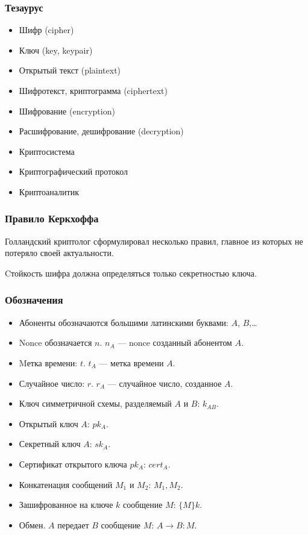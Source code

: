 \begin{frame}
    \frametitle{Тезаурус}

    \begin{itemize}
        \item Шифр (cipher)
        \item Ключ (key, keypair)
        \item Открытый текст (plaintext)
        \item Шифротекст, криптограмма (ciphertext)
        \item Шифрование (encryption)
        \item Расшифрование, дешифрование (decryption) 
        \item Криптосистема
        \item Криптографический протокол
        \item Криптоаналитик
    \end{itemize}
\end{frame}


\begin{frame}
    \frametitle{Правило Керкхоффа}
    
    Голландский криптолог сформулировал несколько правил, главное из которых не потеряло своей актуальности.
    
    \begin{definition}
        Cтойкость шифра должна определяться только секретностью ключа.
    \end{definition}
\end{frame}


\begin{frame}
    \frametitle{Обозначения}
    \begin{itemize}
        \item Абоненты обозначаются большими латинскими буквами: $A$, $B$,\ldots
        \item Nonce обозначается $n$. $n_A$ --- nonce созданный абонентом $A$.
        \item Mетка времени: $t$. $t_A$ --- метка времени $A$.
        \item Случайное число: $r$. $r_A$ --- случайное число, созданное $A$.
        \item Ключ симметричной схемы, разделяемый $A$ и $B$: $k_{AB}$.
        \item Открытый ключ $A$: $pk_A$.
        \item Секретный ключ $A$: $sk_A$.
        \item Сертификат открытого ключа $pk_A$: $cert_A$.
        \item Конкатенация сообщений $M_1$ и $M_2$: $M_1, M_2$.
        \item Зашифрованное на ключе $k$ сообщение $M$: $\{M\}k$.
        \item Обмен. $A$ передает $B$ сообщение $M$: $A\rightarrow B:M$.
    \end{itemize}
\end{frame}


